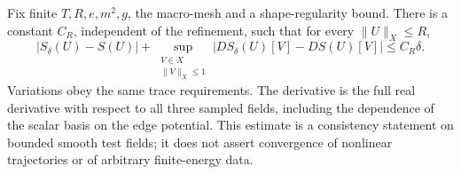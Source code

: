 \begin{theorem}
\label{thm:whitney-spatial-consistency}
Fix finite \(T,R,e,m^2,g\), the macro-mesh and a shape-regularity bound.
There is a constant \(C_R\), independent of the refinement, such that
for every \(\|U\|_X\leq R\),
\begin{equation}
 |S_\delta(U)-S(U)|+
 \sup_{\substack{V\in X\\\|V\|_X\leq1}}
 |DS_\delta(U)[V]-DS(U)[V]|\leq C_R\delta.
 \label{eq:whitney-spatial-action-bound}
\end{equation}
Variations obey the same trace requirements. The derivative is the full
real derivative with respect to all three sampled fields, including the
dependence of the scalar basis on the edge potential. This estimate is a
consistency statement on bounded smooth test fields; it does not assert
convergence of nonlinear trajectories or of arbitrary finite-energy data.
\end{theorem}

